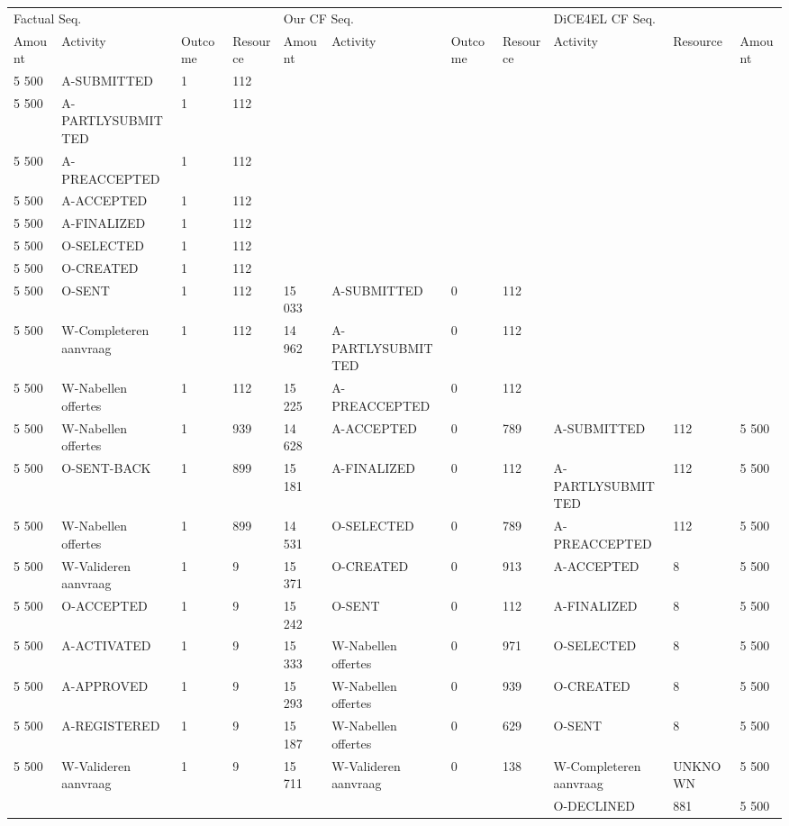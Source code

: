 \begin{tabular}{lllllllllll}
\toprule
\multicolumn{4}{l}{Factual Seq.} & \multicolumn{4}{l}{Our CF Seq.} & \multicolumn{3}{l}{DiCE4EL CF Seq.} \\
Amount & Activity & Outcome & Resource & Amount & Activity & Outcome & Resource & Activity & Resource & Amount \\
\midrule
5 500 & A-SUBMITTED & 1 & 112 &  &  &  &  &  &  &  \\
5 500 & A-PARTLYSUBMITTED & 1 & 112 &  &  &  &  &  &  &  \\
5 500 & A-PREACCEPTED & 1 & 112 &  &  &  &  &  &  &  \\
5 500 & A-ACCEPTED & 1 & 112 &  &  &  &  &  &  &  \\
5 500 & A-FINALIZED & 1 & 112 &  &  &  &  &  &  &  \\
5 500 & O-SELECTED & 1 & 112 &  &  &  &  &  &  &  \\
5 500 & O-CREATED & 1 & 112 &  &  &  &  &  &  &  \\
5 500 & O-SENT & 1 & 112 & 15 033 & A-SUBMITTED & 0 & 112 &  &  &  \\
5 500 & W-Completeren aanvraag & 1 & 112 & 14 962 & A-PARTLYSUBMITTED & 0 & 112 &  &  &  \\
5 500 & W-Nabellen offertes & 1 & 112 & 15 225 & A-PREACCEPTED & 0 & 112 &  &  &  \\
5 500 & W-Nabellen offertes & 1 & 939 & 14 628 & A-ACCEPTED & 0 & 789 & A-SUBMITTED & 112 & 5 500 \\
5 500 & O-SENT-BACK & 1 & 899 & 15 181 & A-FINALIZED & 0 & 112 & A-PARTLYSUBMITTED & 112 & 5 500 \\
5 500 & W-Nabellen offertes & 1 & 899 & 14 531 & O-SELECTED & 0 & 789 & A-PREACCEPTED & 112 & 5 500 \\
5 500 & W-Valideren aanvraag & 1 & 9 & 15 371 & O-CREATED & 0 & 913 & A-ACCEPTED & 8 & 5 500 \\
5 500 & O-ACCEPTED & 1 & 9 & 15 242 & O-SENT & 0 & 112 & A-FINALIZED & 8 & 5 500 \\
5 500 & A-ACTIVATED & 1 & 9 & 15 333 & W-Nabellen offertes & 0 & 971 & O-SELECTED & 8 & 5 500 \\
5 500 & A-APPROVED & 1 & 9 & 15 293 & W-Nabellen offertes & 0 & 939 & O-CREATED & 8 & 5 500 \\
5 500 & A-REGISTERED & 1 & 9 & 15 187 & W-Nabellen offertes & 0 & 629 & O-SENT & 8 & 5 500 \\
5 500 & W-Valideren aanvraag & 1 & 9 & 15 711 & W-Valideren aanvraag & 0 & 138 & W-Completeren aanvraag & UNKNOWN & 5 500 \\
 &  &  &  &  &  &  &  & O-DECLINED & 881 & 5 500 \\
\bottomrule
\end{tabular}
